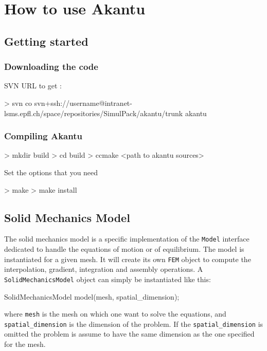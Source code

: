 \documentclass[a4paper,11pt]{book}
\newcommand{\akantu}{{\cminfamily{\textbf{Akantu}}}\xspace}
\newcommand{\code}[1]{\texttt{#1}}
\begin{document}
\chapter{How to use Akantu}
\section{Getting started}
\subsection{Downloading the code}
SVN URL to get \akantu :
\begin{command}
  > svn co svn+ssh://username@intranet-lsms.epfl.ch/space/repositories/SimulPack/akantu/trunk akantu
\end{command}

\subsection{Compiling Akantu}
\begin{command}
  > mkdir build
  > cd build
  > ccmake <path to akantu sources>
\end{command}

Set the options that you need

\begin{command}
  > make
  > make install
\end{command}

\section{Solid Mechanics Model}

The  solid mechanics  model is  a  specific implementation  of the  \code{Model}
interface dedicated  to handle  the equations of  motion or of  equilibrium. The
model  is instantiated  for a  given mesh.   It will  create its  own \code{FEM}
object  to  compute  the   interpolation,  gradient,  integration  and  assembly
operations. A \code{SolidMechanicsModel} object  can simply be instantiated like
this:
\begin{cpp}
  SolidMechanicsModel model(mesh, spatial_dimension);
\end{cpp}
where \code{mesh}  is the  mesh on which  one want  to solve the  equations, and
\code{spatial\_dimension}   is   the  dimension   of   the   problem.   If   the
\code{spatial\_dimension}  is omitted  the problem  is assume  to have  the same
dimension as the one specified for the mesh.
\end{document}
